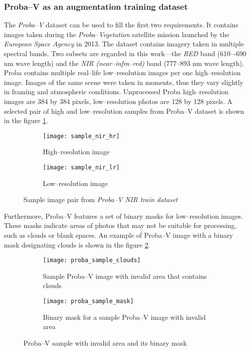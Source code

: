 \subsubsection{Proba--V as an augmentation training dataset}
\label{sec:probav}
The \textit{Proba--V} dataset \cite{esa-proba} can be used to fill the first two requirements.
It contains images taken during the \textit{Proba--Vegetation} satellite mission launched by the \textit{European Space Agency} in 2013.
The dataset contains imagery taken in multiple spectral bands.
Two subsets are regarded in this work---the \textit{RED} band (610–-690 \si{\nano\meter} wave length) and the \textit{NIR (near--infra--red)} band (777--893 \si{\nano\meter} wave length).
Proba contains multiple real--life low--resolution images per one high--resolution image.
Images of the same scene were taken in moments, thus they vary slightly in framing and atmospheric conditions.
Unprocessed Proba high--resolution images are 384 by 384 pixels, low--resolution photos are 128 by 128 pixels.
A selected pair of high and low--resolution samples from Proba--V dataset is shown in the figure \ref{fig:proba-sample}.
\begin{figure}
    \begin{subfigure}{0.45\textwidth}
        \centering
        \texttt{[image: sample\_nir\_hr]}
        \caption{High--resolution image}
    \end{subfigure}
    \hfill
    \begin{subfigure}{0.45\textwidth}
        \centering
        \texttt{[image: sample\_nir\_lr]}
        \caption{Low--resolution image}
    \end{subfigure}
    \caption{Sample image pair from \textit{Proba--V NIR train dataset}}
    \label{fig:proba-sample}
\end{figure}
Furthermore, Proba--V features a set of binary masks for low--resolution images.
These masks indicate areas of photos that may not be suitable for processing, such as clouds or blank spaces.
An example of Proba--V image with a binary mask designating clouds is shown in the figure \ref{fig:proba_sample_mask}.
\begin{figure}
    \begin{subfigure}{0.45\textwidth}
        \centering
        \texttt{[image: proba\_sample\_clouds]}
        \caption{Sample Proba--V image with invalid area that contains clouds}
    \end{subfigure}
    \hfill
    \begin{subfigure}{0.45\textwidth}
        \centering
        \texttt{[image: proba\_sample\_mask]}
        \caption{Binary mask for a sample Proba--V image with invalid area}
    \end{subfigure}
    \caption{Proba--V sample with invalid area and its binary mask}
    \label{fig:proba_sample_mask}
\end{figure}

